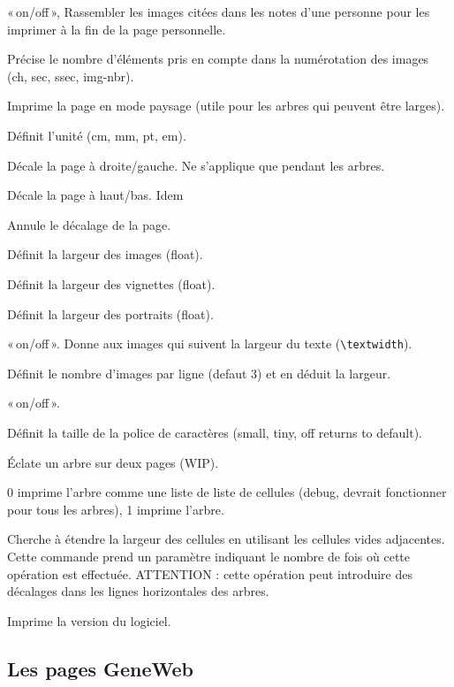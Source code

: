 \begin{description}[style=nextline]
\item[CollectImages] «\,on/off\,», Rassembler les images citées dans les notes
d'une personne pour les imprimer à la fin de la page personnelle.
\item[ImageLabel] Précise le nombre d'éléments pris en compte dans
la numérotation des images (ch, sec, ssec, img-nbr).
\item[Sideways] Imprime la page en mode paysage (utile pour les arbres
qui peuvent être larges).\label{sideways}
\item[Unit] Définit l'unité (cm, mm, pt, em).
\item[Hoffset] Décale la page à droite/gauche. Ne s'applique que pendant les arbres.
\item[Voffset] Décale la page à haut/bas. Idem
\item[OffsetOff] Annule le décalage de la page.
\item[ImgWidth] Définit la largeur des images (float).
\item[VignWidth] Définit la largeur des vignettes (float).
\item[PortraitWidth] Définit la largeur des portraits (float).
\item[WideImages] «\,on/off\,». Donne aux images qui suivent la largeur du texte
(\verb|\textwidth|).
\item[NbImgPerLine] Définit le nombre d'images par ligne (defaut 3) et en
déduit la largeur.
\item[Arbres/Trees] «\,on/off\,».
\item[FontSize] Définit la taille de la police de caractères\label{fontsize}
(small, tiny, off returns to default).
\item[TwoPages] Éclate un arbre sur deux pages (WIP).
\item[TreeMode] 0 imprime l'arbre comme une liste de liste de cellules
(debug, devrait fonctionner pour tous les arbres), 1 imprime l'arbre.
\item[Expand] Cherche à étendre la largeur des cellules en utilisant
les cellules vides adjacentes. Cette commande prend un paramètre indiquant
le nombre de fois où cette opération est effectuée. ATTENTION : cette opération
peut introduire des décalages dans les lignes horizontales des arbres.

\item[Version] Imprime la version du logiciel.
\end{description}

\subsection{Les pages GeneWeb}

